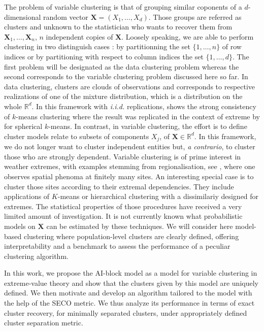 \documentclass[11pt]{article}
\begin{document}
	The problem of variable clustering is that of grouping similar coponents of a $d$-dimensional random vector $\textbf{X} = (X_1,\dots,X_d)$. Those groups are referred as clusters and unknown to the statistician who wants to recover them from $\textbf{X}_1, \dots, \textbf{X}_n$, $n$ independent copies of $\textbf{X}$. Loosely speaking, we are able to perform clustering in two distinguish cases : by partitionning the set $\{1,\dots, n\}$ of row indices or by partitioning with respect to column indices the set $\{1,\dots,d\}$. The first problem will be designated as the data clustering problem whereas the second corresponds to the variable clustering problem discussed here so far. In data clustering, clusters are clouds of observations and corresponds to respective realizations of one of the mixture distribution, which is a distribution on the whole $\mathbb{R}^d$. In this framework with \emph{i.i.d.} replications, \cite{pollard1981strong} shows the strong consistency of $k$-means clustering where the result was replicated in the context of extreme by \cite{janssen2020k} for spherical $k$-means. In contrast, in variable clustering, the effort is to define cluster models relate to subsets of components $X_j$, of $\textbf{X} \in \mathbb{R}^d$. In this framework, we do not longer want to cluster independent entities but, \emph{a contrario}, to cluster those who are strongly dependent. Variable clustering is of prime interest in weather extremes, with examples stemming from regionalisation, see \cite{bernard2013clustering,bador2015spatial, saunders2021regionalisation}, where one observes spatial phenoma at finitely many sites. An interesting special case is to cluster those sites according to their extremal dependencies. They include applications of $K$-means or hierarchical clustering with a dissimilariy designed for extremes. The statistical properties of those procedures have received a very limited amount of investigation. It is not currently known what probabilistic models on $\textbf{X}$ can be estimated by these techniques. We will consider here model-based clustering where population-level clusters are clearly defined, offering interpretability and a benchmark to assess the performance of a peculiar clustering algorithm.
	
	In this work, we propose the AI-block model as a model for variable clustering in extreme-value theory and show that the clusters given by this model are uniquely defined. We then motivate and develop an algorithm tailored to the model with the help of the SECO metric. We thus analyze its performance in terms of exact cluster recovery, for minimally separated clusters, under appropriately defined cluster separation metric.
	
\end{document}
